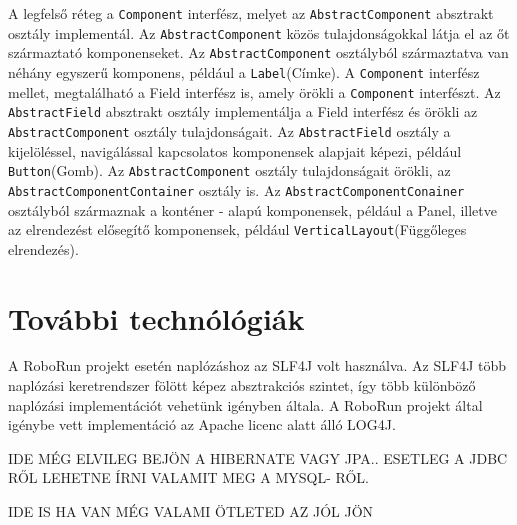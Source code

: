 A legfelső réteg a \texttt{Component} interfész, melyet az \texttt{AbstractComponent} absztrakt osztály implementál. Az \texttt{AbstractComponent} közös tulajdonságokkal látja el az őt származtató komponenseket. Az \texttt{AbstractComponent} osztályból származtatva van néhány egyszerű komponens, például a \texttt{Label}(Címke). A \texttt{Component} interfész mellet, megtalálható a Field interfész is, amely örökli a \texttt{Component} interfészt. Az \texttt{AbstractField} absztrakt osztály implementálja a Field interfész és örökli az \texttt{AbstractComponent} osztály tulajdonságait. Az \texttt{AbstractField} osztály a kijelöléssel, navigálással kapcsolatos komponensek alapjait képezi, például \texttt{Button}(Gomb). Az \texttt{AbstractComponent} osztály tulajdonságait örökli, az \texttt{AbstractComponentContainer} osztály is. Az \texttt{AbstractComponentConainer} osztályból származnak a konténer - alapú komponensek, például a Panel, illetve az elrendezést elősegítő komponensek, például \texttt{VerticalLayout}(Függőleges elrendezés).

\section{További technólógiák}\label{sec:TovábbiTecnlólógiak}

A RoboRun projekt esetén naplózáshoz az SLF4J volt használva. Az SLF4J több naplózási keretrendszer fölött képez absztrakciós szintet, így több különböző naplózási implementációt vehetünk igényben általa. A RoboRun projekt által igénybe vett implementáció az Apache licenc alatt álló LOG4J.


IDE MÉG ELVILEG BEJÖN A HIBERNATE VAGY JPA.. ESETLEG A JDBC RŐL LEHETNE ÍRNI VALAMIT MEG A MYSQL- RŐL.

IDE IS HA VAN MÉG VALAMI ÖTLETED AZ JÓL JÖN
